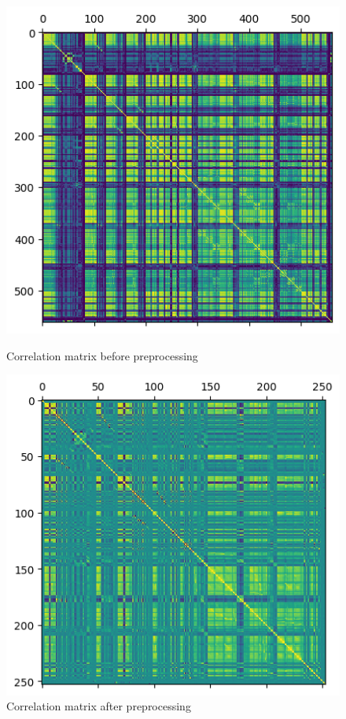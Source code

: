 \begin{figure}[ht]
    \centering
    \begin{minipage}{0.45\textwidth}
        \centering
        \includegraphics[width=\textwidth]{./img/correlation-matrix-before}
        \caption{Correlation matrix before preprocessing}
        \label{fig:cormat-before}
    \end{minipage}\hfill
    \begin{minipage}{0.45\textwidth}
        \centering
        \includegraphics[width=\textwidth]{./img/correlation-matrix-after}
        \caption{Correlation matrix after preprocessing}
        \label{fig:cormat-after}
    \end{minipage}
\end{figure}

